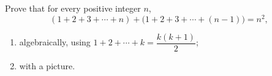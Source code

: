 Prove that for every positive integer $n$,
\[
(1+2+3+\cdots+n)+\bigl(1+2+3+\cdots+(n-1)\bigr)=n^2,
\]
\begin{enumerate}
\item[(a)] algebraically, using $1+2+\cdots+k=\dfrac{k(k+1)}{2}$;
\item[(b)] with a picture.
\end{enumerate}
